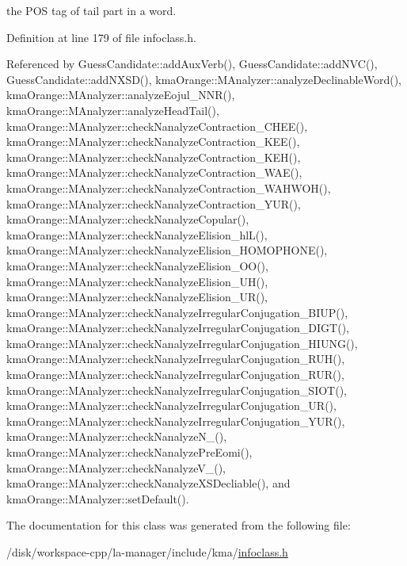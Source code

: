 the POS tag of tail part in a word. 



Definition at line 179 of file infoclass.h.

Referenced by GuessCandidate::addAuxVerb(), GuessCandidate::addNVC(), GuessCandidate::addNXSD(), kmaOrange::MAnalyzer::analyzeDeclinableWord(), kmaOrange::MAnalyzer::analyzeEojul\_\-NNR(), kmaOrange::MAnalyzer::analyzeHeadTail(), kmaOrange::MAnalyzer::checkNanalyzeContraction\_\-CHEE(), kmaOrange::MAnalyzer::checkNanalyzeContraction\_\-KEE(), kmaOrange::MAnalyzer::checkNanalyzeContraction\_\-KEH(), kmaOrange::MAnalyzer::checkNanalyzeContraction\_\-WAE(), kmaOrange::MAnalyzer::checkNanalyzeContraction\_\-WAHWOH(), kmaOrange::MAnalyzer::checkNanalyzeContraction\_\-YUR(), kmaOrange::MAnalyzer::checkNanalyzeCopular(), kmaOrange::MAnalyzer::checkNanalyzeElision\_\-hlL(), kmaOrange::MAnalyzer::checkNanalyzeElision\_\-HOMOPHONE(), kmaOrange::MAnalyzer::checkNanalyzeElision\_\-OO(), kmaOrange::MAnalyzer::checkNanalyzeElision\_\-UH(), kmaOrange::MAnalyzer::checkNanalyzeElision\_\-UR(), kmaOrange::MAnalyzer::checkNanalyzeIrregularConjugation\_\-BIUP(), kmaOrange::MAnalyzer::checkNanalyzeIrregularConjugation\_\-DIGT(), kmaOrange::MAnalyzer::checkNanalyzeIrregularConjugation\_\-HIUNG(), kmaOrange::MAnalyzer::checkNanalyzeIrregularConjugation\_\-RUH(), kmaOrange::MAnalyzer::checkNanalyzeIrregularConjugation\_\-RUR(), kmaOrange::MAnalyzer::checkNanalyzeIrregularConjugation\_\-SIOT(), kmaOrange::MAnalyzer::checkNanalyzeIrregularConjugation\_\-UR(), kmaOrange::MAnalyzer::checkNanalyzeIrregularConjugation\_\-YUR(), kmaOrange::MAnalyzer::checkNanalyzeN\_\-(), kmaOrange::MAnalyzer::checkNanalyzePreEomi(), kmaOrange::MAnalyzer::checkNanalyzeV\_\-(), kmaOrange::MAnalyzer::checkNanalyzeXSDecliable(), and kmaOrange::MAnalyzer::setDefault().

The documentation for this class was generated from the following file:\begin{CompactItemize}
\item 
/disk/workspace-cpp/la-manager/include/kma/\hyperlink{infoclass_8h}{infoclass.h}\end{CompactItemize}
